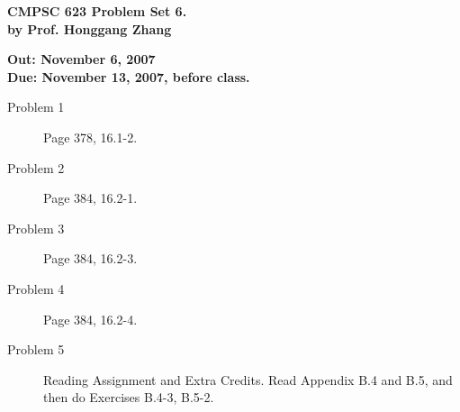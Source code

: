 \documentclass[11pt]{article}
\begin{document}

\begin{center}
{\bf CMPSC 623 Problem Set 6. } \\
{\bf by Prof. Honggang Zhang} \\
\end{center}
\begin{center}
{\bf Out: November 6, 2007} \\
{\bf Due: November 13, 2007, before class.} \\

\end{center}


\begin{description}


\item[Problem 1] Page 378, 16.1-2.

\item[Problem 2] Page 384, 16.2-1.

\item[Problem 3] Page 384, 16.2-3.

\item[Problem 4] Page 384, 16.2-4.

\item[Problem 5] Reading Assignment and Extra Credits. Read Appendix B.4 and B.5, and then do Exercises B.4-3, B.5-2.

\end{description}
\end{document}
